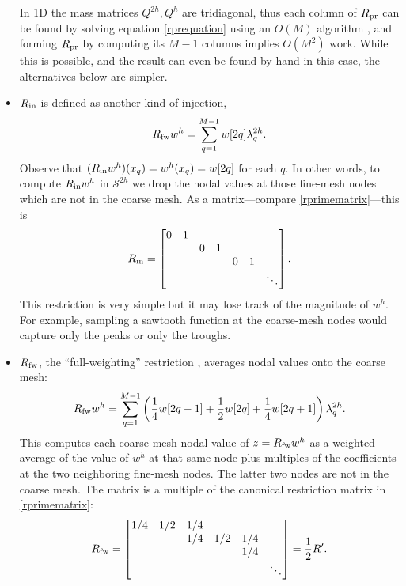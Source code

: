 \documentclass[letterpaper,final,12pt,reqno]{amsart}
\begin{document}
\begin{itemize}
In 1D the mass matrices $Q^{2h},Q^h$ are tridiagonal, thus each column of $R_{\text{pr}}$ can be found by solving equation \eqref{rprequation} using an $O(M)$ algorithm \cite{TrefethenBau1997}, and forming $R_{\text{pr}}$ by computing its $M-1$ columns implies $O(M^2)$ work.  While this is possible, and the result can even be found by hand in this case, the alternatives below are simpler.
\item $R_{\text{in}}$ is defined as another kind of injection,
\begin{equation}
  R_{\text{fw}} w^h = \sum_{q=1}^{M-1} w[2q] \lambda_q^{2h}. \label{rindefinition}
\end{equation}
Observe that $(R_{\text{in}} w^h)(x_q) = w^h(x_q) = w[2q]$ for each $q$.  In other words, to compute $R_{\text{in}} w^h$ in $\mathcal{S}^{2h}$ we drop the nodal values at those fine-mesh nodes which are not in the coarse mesh.  As a matrix---compare \eqref{rprimematrix}---this is
\begin{equation}
R_{\text{in}} = \begin{bmatrix}
0 & 1 &   &   &   &   &\\
  &   & 0 & 1 &   &   & \\
  &   &   &   & 0 & 1 & \\
  &   &   &   &   &   & \ddots
\end{bmatrix}. \label{rinmatrix}
\end{equation}
This restriction is very simple but it may lose track of the magnitude of $w^h$.  For example, sampling a sawtooth function at the coarse-mesh nodes would capture only the peaks or only the troughs.
\item $R_{\text{fw}}$, the ``full-weighting'' restriction \cite{Briggsetal2000}, averages nodal values onto the coarse mesh:
\begin{equation}
  R_{\text{fw}} w^h = \sum_{q=1}^{M-1} \left(\frac{1}{4} w[2q-1] + \frac{1}{2} w[2q] + \frac{1}{4} w[2q+1]\right) \lambda_q^{2h}. \label{rfwdefinition}
\end{equation}
This computes each coarse-mesh nodal value of $z=R_{\text{fw}} w^h$ as a weighted average of the value of $w^h$ at that same node plus multiples of the coefficients at the two neighboring fine-mesh nodes.  The latter two nodes are not in the coarse mesh.  The matrix is a multiple of the canonical restriction matrix in \eqref{rprimematrix}:
\begin{equation}
R_{\text{fw}} = \begin{bmatrix}
1/4 & 1/2 & 1/4 &     &     &  \\
    &     & 1/4 & 1/2 & 1/4 &  \\
    &     &     &     & 1/4 &  \\
    &     &     &     &     & \ddots
\end{bmatrix} = \frac{1}{2} R'. \label{rfwmatrix}
\end{equation}
\end{itemize}
\end{document}
